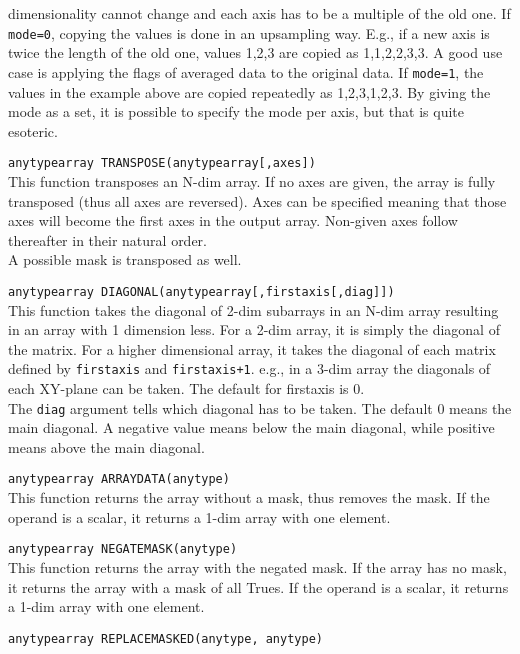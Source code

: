 \begin{description}
    dimensionality cannot change and each axis has to be a
    multiple of the old one. If \texttt{mode=0}, copying the values is
    done in an upsampling way. E.g., if a new axis is twice the length
    of the old one, values 1,2,3 are copied as 1,1,2,2,3,3. A good use case is
    applying the flags of averaged data to the original data. 
    If \texttt{mode=1}, the values in the example above are copied
    repeatedly as 1,2,3,1,2,3.
    By giving the mode as a set, it is possible to specify the mode
    per axis, but that is quite esoteric. 
  \item[] \texttt{anytypearray TRANSPOSE(anytypearray[,axes])}\\
    This function transposes an N-dim array. If no axes
    are given, the array is fully transposed (thus all axes are
    reversed). Axes can be specified meaning that those axes will become the
    first axes in the output array. Non-given axes follow thereafter
    in their natural order.
    \\A possible mask is transposed as well.
  \item[] \texttt{anytypearray DIAGONAL(anytypearray[,firstaxis[,diag]])}\\
    This function takes the diagonal of 2-dim subarrays in an N-dim array resulting in
    an array with 1 dimension less. For a 2-dim array, it is simply the
    diagonal of the matrix. For a higher dimensional array, it takes
    the diagonal of each matrix defined by \texttt{firstaxis} and
    \texttt{firstaxis+1}. e.g., in a 3-dim array the
    diagonals of each XY-plane can be taken. The default for firstaxis
    is 0.
    \\The \texttt{diag} argument tells which diagonal has to be
    taken. The default 0 means the main diagonal. A negative value means
    below the main diagonal, while positive means above the main diagonal.
 \item[] \texttt{anytypearray ARRAYDATA(anytype)}\\
    This function returns the array without a mask, thus removes the mask.
    If the operand is a scalar, it returns a 1-dim array with one element.
 \item[] \texttt{anytypearray NEGATEMASK(anytype)}\\
    This function returns the array with the negated mask. If the array has
    no mask, it returns the array with a mask of all Trues.
    If the operand is a scalar, it returns a 1-dim array with one element.
 \item[] \texttt{anytypearray REPLACEMASKED(anytype, anytype)}\\

\end{description}

